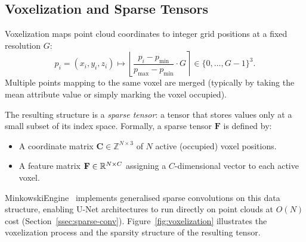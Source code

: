 \subsection{Voxelization and Sparse Tensors}
\label{ssec:voxelization}

Voxelization maps point cloud coordinates to integer grid positions at a
fixed resolution $G$:
\begin{equation}
  p_i = (x_i, y_i, z_i) \longmapsto
    \left\lfloor \frac{p_i - p_{\min}}{p_{\max} - p_{\min}} \cdot G \right\rceil
    \in \{0, \ldots, G-1\}^3.
\end{equation}
Multiple points mapping to the same voxel are merged (typically by taking
the mean attribute value or simply marking the voxel occupied).

The resulting structure is a \emph{sparse tensor}: a tensor that stores
values only at a small subset of its index space.
Formally, a sparse tensor $\mathbf{F}$ is defined by:
\begin{itemize}
  \item A coordinate matrix $\mathbf{C} \in \mathbb{Z}^{N \times 3}$ of $N$
    active (occupied) voxel positions.
  \item A feature matrix $\mathbf{F} \in \mathbb{R}^{N \times C}$ assigning a
    $C$-dimensional vector to each active voxel.
\end{itemize}
MinkowskiEngine~\cite{choy20194d} implements generalised sparse
convolutions on this data structure, enabling U-Net architectures to run
directly on point clouds at $O(N)$ cost (Section~\ref{ssec:sparse-conv}).
Figure~\ref{fig:voxelization} illustrates the voxelization process and the
sparsity structure of the resulting tensor.

